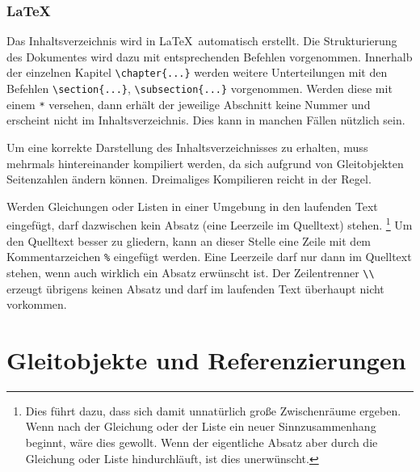 \subsubsection*{\LaTeX}

Das Inhaltsverzeichnis wird in \LaTeX\ automatisch erstellt.
Die Strukturierung des Dokumentes wird dazu mit entsprechenden Befehlen vorgenommen.
Innerhalb der einzelnen Kapitel \verb|\chapter{...}| werden weitere Unterteilungen mit den Befehlen \verb|\section{...}|, \verb|\subsection{...}| \usw vorgenommen.
Werden diese mit einem \verb|*| versehen, dann erhält der jeweilige Abschnitt keine Nummer und erscheint nicht im Inhaltsverzeichnis.
Dies kann in manchen Fällen nützlich sein.

Um eine korrekte Darstellung des Inhaltsverzeichnisses zu erhalten, muss \ggf mehrmals hintereinander kompiliert werden, da sich aufgrund von Gleitobjekten Seitenzahlen ändern können.
Dreimaliges Kompilieren reicht in der Regel.


Werden Gleichungen oder Listen in einer Umgebung in den laufenden Text eingefügt, darf dazwischen kein Absatz (\dah eine Leerzeile im Quelltext) stehen.%
\footnote{Dies führt dazu, dass sich   damit unnatürlich große Zwischenräume ergeben.
  Wenn nach der Gleichung oder der Liste ein neuer Sinnzusammenhang beginnt, wäre dies gewollt.
  Wenn der eigentliche Absatz aber durch die Gleichung oder Liste hindurchläuft, ist dies unerwünscht.}
Um den Quelltext besser zu gliedern, kann an dieser Stelle eine Zeile mit dem Kommentarzeichen \verb|%| eingefügt werden.
Eine Leerzeile darf nur dann im Quelltext stehen, wenn auch wirklich ein Absatz erwünscht ist.
Der Zeilentrenner \verb|\\| erzeugt übrigens keinen Absatz und darf im laufenden Text überhaupt nicht vorkommen.




\section{Gleitobjekte und Referenzierungen}

